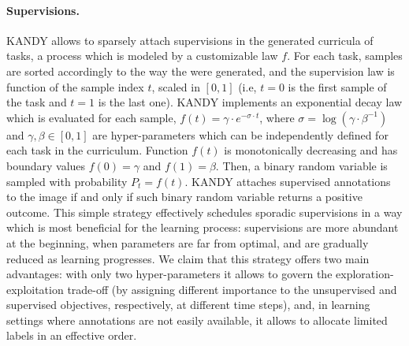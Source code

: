 \paragraph{Supervisions.} \textsc{KANDY} allows to sparsely attach supervisions in the generated curricula of tasks, a process which is modeled by a customizable law $f$. For each task, samples are sorted accordingly to the way the were generated, and the supervision law is function of the sample index $t$, scaled in $[0, 1]$ (i.e, $t=0$ is the first sample of the task and $t=1$ is the last one). %
\textsc{KANDY} implements an exponential decay law which is evaluated for each sample, $f(t) = \gamma \cdot e^{-\sigma \cdot t}$, where $\sigma = \log(\gamma \cdot \beta^{-1})$ and $\gamma, \beta \in [0, 1]$ are hyper-parameters which can be independently defined for each task in the curriculum.
Function $f(t)$ is monotonically decreasing and has boundary values $f(0) = \gamma$ and $f(1) = \beta$.
Then, a binary random variable is sampled with probability $P_t = f(t)$. \textsc{KANDY} attaches supervised annotations to the image if and only if such binary random variable returns a positive outcome.
This simple strategy effectively schedules sporadic supervisions in a way which is most beneficial for the learning process: supervisions are more abundant at the beginning, when parameters are far from optimal, and are gradually reduced as learning progresses.
We claim that this strategy offers two main advantages: with only two hyper-parameters it allows to govern the exploration-exploitation trade-off (by assigning different importance to the unsupervised and supervised objectives, respectively, at different time steps), and, in learning settings where annotations are not easily available, it allows to allocate limited labels in an effective order.

